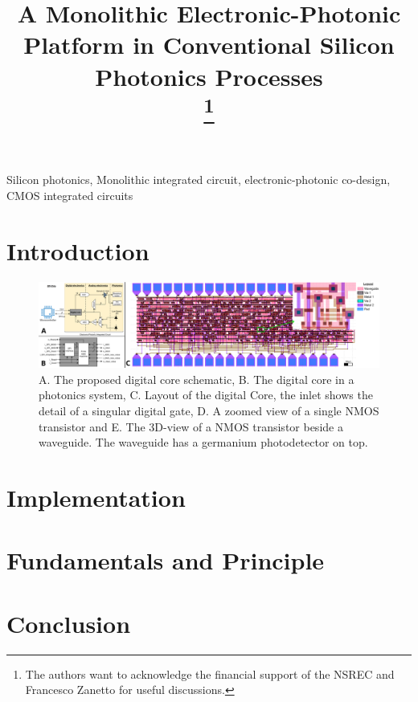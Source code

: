 \documentclass[conference]{IEEEtran}
\begin{document}
\title{A Monolithic Electronic-Photonic Platform in Conventional Silicon Photonics Processes\\
\thanks{The authors want to acknowledge the financial support of the NSREC and Francesco Zanetto for useful discussions.}
}
\author{
}

\newcommand{\CitationNeeded}{\textcolor{red}{\setlength{\fboxsep}{1pt}\colorbox{yellow}{[citation needed]}}}
\newcommand{\Value}{\textcolor{red}{\setlength{\fboxsep}{1pt}\colorbox{yellow}{[Missing Value]}}}
\newcommand{\MFig}{\textcolor{blue}{\setlength{\fboxsep}{1pt}\colorbox{green}{[Missing Figure]}}}

\maketitle

\begin{abstract}

\end{abstract}

\begin{IEEEkeywords}
Silicon photonics, Monolithic integrated circuit, electronic-photonic co-design, CMOS integrated circuits
\end{IEEEkeywords}

\section{Introduction}


\begin{figure}[t]
    \centering
    \includegraphics[width=\textwidth]{Core.png}
    \caption{A. The proposed digital core schematic, 
    B. The digital core in a photonics system,
    C. Layout of the digital Core, the inlet shows the detail of a singular digital gate,
    D. A zoomed view of a single NMOS transistor and
    E. The 3D-view of a NMOS transistor beside a waveguide. The waveguide has a germanium photodetector on top.   
    }
    \label{fig:Core}
\end{figure}

\section{Implementation}


\section{Fundamentals and Principle}




\section{Conclusion}



\end{document}

